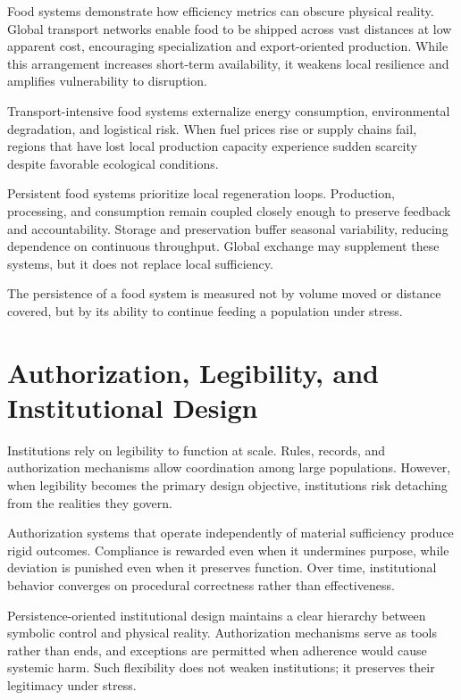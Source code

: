 \documentclass[12pt]{article} \usepackage[margin=1in]{geometry} \usepackage{setspace} \usepackage{amsmath,amssymb} \usepackage{hyperref}
\begin{document}
Food systems demonstrate how efficiency metrics can obscure physical reality. Global transport networks enable food to be shipped across vast distances at low apparent cost, encouraging specialization and export-oriented production. While this arrangement increases short-term availability, it weakens local resilience and amplifies vulnerability to disruption.

Transport-intensive food systems externalize energy consumption, environmental degradation, and logistical risk. When fuel prices rise or supply chains fail, regions that have lost local production capacity experience sudden scarcity despite favorable ecological conditions.

Persistent food systems prioritize local regeneration loops. Production, processing, and consumption remain coupled closely enough to preserve feedback and accountability. Storage and preservation buffer seasonal variability, reducing dependence on continuous throughput. Global exchange may supplement these systems, but it does not replace local sufficiency.

The persistence of a food system is measured not by volume moved or distance covered, but by its ability to continue feeding a population under stress.

\section{Authorization, Legibility, and Institutional Design}

Institutions rely on legibility to function at scale. Rules, records, and authorization mechanisms allow coordination among large populations. However, when legibility becomes the primary design objective, institutions risk detaching from the realities they govern.

Authorization systems that operate independently of material sufficiency produce rigid outcomes. Compliance is rewarded even when it undermines purpose, while deviation is punished even when it preserves function. Over time, institutional behavior converges on procedural correctness rather than effectiveness.

Persistence-oriented institutional design maintains a clear hierarchy between symbolic control and physical reality. Authorization mechanisms serve as tools rather than ends, and exceptions are permitted when adherence would cause systemic harm. Such flexibility does not weaken institutions; it preserves their legitimacy under stress.
\end{document}
